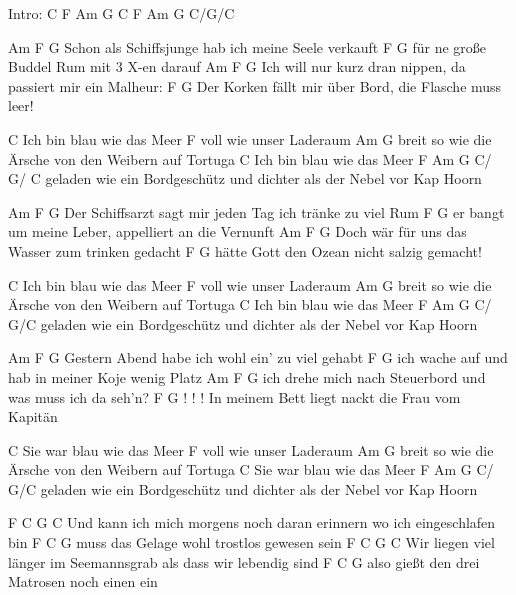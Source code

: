 Intro:
C F Am G
C F Am G C/G/C


          Am                         F        G
Schon als Schiffsjunge hab ich meine Seele verkauft
       F                      G
für ne große Buddel Rum mit 3 X-en darauf
    Am                                 F              G
Ich will nur kurz dran nippen, da passiert mir ein Malheur:
    F                               G
Der Korken fällt mir über Bord, die Flasche muss leer!

C
Ich bin blau wie das Meer
F
voll wie unser Laderaum
Am                              G
breit so wie die Ärsche von den Weibern auf Tortuga
C
Ich bin blau wie das Meer
F                                Am              G             C/  G/ C
geladen wie ein Bordgeschütz und dichter als der Nebel vor Kap Hoorn

    Am                                 F              G
Der Schiffsarzt sagt mir jeden Tag ich tränke zu viel Rum
   F                            G
er bangt um meine Leber, appelliert an die Vernunft
     Am                         F          G
Doch wär für uns das Wasser zum trinken gedacht
F                          G
hätte Gott den Ozean nicht salzig gemacht!

C
Ich bin blau wie das Meer
F
voll wie unser Laderaum
Am                              G
breit so wie die Ärsche von den Weibern auf Tortuga
C
Ich bin blau wie das Meer
F                                Am              G             C/   G/C
geladen wie ein Bordgeschütz und dichter als der Nebel vor Kap Hoorn

 Am                         F              G
Gestern Abend habe ich wohl ein' zu viel gehabt
      F                          G
ich wache auf und hab in meiner Koje wenig Platz
    Am                             F               G
ich drehe mich nach Steuerbord und was muss ich da seh'n?
   F                                G   ! ! !
In meinem Bett liegt nackt die Frau vom Kapitän

C
Sie war blau wie das Meer
F
voll wie unser Laderaum
Am                              G
breit so wie die Ärsche von den Weibern auf Tortuga
C
Sie war blau wie das Meer
F                                Am              G             C/   G/C
geladen wie ein Bordgeschütz und dichter als der Nebel vor Kap Hoorn

    F                          C              G              C
Und kann ich mich morgens noch daran erinnern wo ich eingeschlafen bin
F                    C                G
muss das Gelage wohl trostlos gewesen sein
    F                     C                G                 C
Wir liegen viel länger im Seemannsgrab als dass wir lebendig sind
     F                C                 G
also gießt den drei Matrosen noch einen ein

